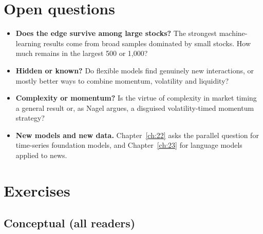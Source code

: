 \section{Open questions}
\label{sec:21-open}

\begin{itemize}
  \item \textbf{Does the edge survive among large stocks?} The strongest machine-learning results come from broad samples dominated by small stocks. How much remains in the largest 500 or 1,000?
  \item \textbf{Hidden or known?} Do flexible models find genuinely new interactions, or mostly better ways to combine momentum, volatility and liquidity?
  \item \textbf{Complexity or momentum?} Is the virtue of complexity in market timing a general result or, as Nagel argues, a disguised volatility-timed momentum strategy?
  \item \textbf{New models and new data.} Chapter~\ref{ch:22} asks the parallel question for time-series foundation models, and Chapter~\ref{ch:23} for language models applied to news.
\end{itemize}

\section*{Exercises}

\subsection*{Conceptual (all readers)}

